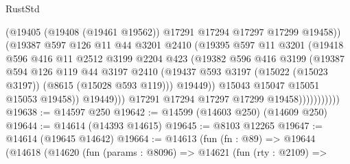 \begin{lexlean}{RustStd}
\begin{coremodule}
                                (@19405
                                  (@19408 (@19461 @19562))
                                  @17291
                                  @17294
                                  @17297
                                  @17299
                                  @19458))
                              (@19387
                                @597
                                @126
                                @11
                                @44
                                @3201
                                @2410
                                (@19395
                                  @597
                                  @11
                                  @3201
                                  (@19418
                                    @596
                                    @416
                                    @11
                                    @2512
                                    @3199
                                    @2204
                                    @423
                                    (@19382
                                      @596
                                      @416
                                      @3199
                                      (@19387
                                        @594
                                        @126
                                        @119
                                        @44
                                        @3197
                                        @2410
                                        (@19437
                                          @593
                                          @3197
                                          (@15022 (@15023 @3197))
                                          (@8615 (@15028 @593 @119)))
                                        @19449))
                                    @15043
                                    @15047
                                    @15051
                                    @15053
                                    @19458))
                                @19449)))
                          @17291
                          @17294
                          @17297
                          @17299
                          @19458)))))))))))
@19638 := @14597 @250
@19642 := @14599 (@14603 @250) (@14609 @250)
@19644 := @14614 (@14393 @14615)
@19645 := @8103 @12265
@19647 := @14614 (@19645 @14642)
@19664 := @14613
    (fun (fn : @89) =>
    @19644
      (@14618
        (@14620
          (fun (params : @8096) =>
          @14621
            (fun (rty : @2109) =>

\end{coremodule}
\end{lexlean}
